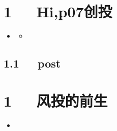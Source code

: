 \documentclass[letterpaper,10pt,english]{sphinxmanual}
\begin{document}
\chapter{1   Hi,p07创投}
\label{\detokenize{p07_u521b_u6295/Hello_uff0cp07_u521b_u6295:hi-p07}}\label{\detokenize{p07_u521b_u6295/Hello_uff0cp07_u521b_u6295::doc}}
\begin{sphinxShadowBox}
\begin{itemize}
\item {} 
\label{\detokenize{p07_u521b_u6295/Hello_uff0cp07_u521b_u6295:id2}}{\hyperref[\detokenize{p07_u521b_u6295/Hello_uff0cp07_u521b_u6295:hi-p07}]{}}
\begin{itemize}
\item {} 
\label{\detokenize{p07_u521b_u6295/Hello_uff0cp07_u521b_u6295:id3}}{\hyperref[\detokenize{p07_u521b_u6295/Hello_uff0cp07_u521b_u6295:post}]{}}

\end{itemize}

\end{itemize}
\end{sphinxShadowBox}


\section{1.1   post}
\label{\detokenize{p07_u521b_u6295/Hello_uff0cp07_u521b_u6295:post}}

\chapter{1   风投的前生}
\label{\detokenize{p07_u521b_u6295/_u98ce_u6295_u7684_u524d_u751f:id1}}\label{\detokenize{p07_u521b_u6295/_u98ce_u6295_u7684_u524d_u751f::doc}}
\begin{sphinxShadowBox}
\begin{itemize}
\item {} 
\label{\detokenize{p07_u521b_u6295/_u98ce_u6295_u7684_u524d_u751f:id3}}{\hyperref[\detokenize{p07_u521b_u6295/_u98ce_u6295_u7684_u524d_u751f:id1}]{}}

\end{itemize}
\end{sphinxShadowBox}
\end{document}
